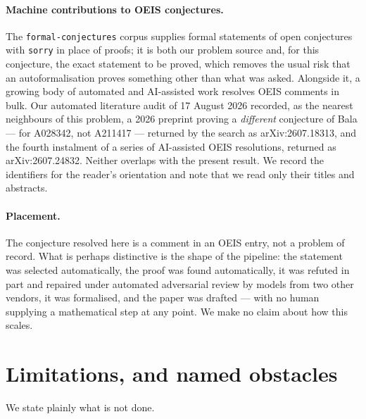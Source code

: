\documentclass[11pt]{article}
\theoremstyle{plain}
\theoremstyle{definition}
\theoremstyle{remark}
\numberwithin{equation}{section}
\begin{document}
\paragraph{Machine contributions to OEIS conjectures.} The \texttt{formal-conjectures} corpus
\cite{formalconjectures} supplies formal statements of open conjectures with \texttt{sorry} in
place of proofs; it is both our problem source and, for this conjecture, the exact statement to
be proved, which removes the usual risk that an autoformalisation proves something other than
what was asked. Alongside it, a growing body of automated and AI-assisted work resolves OEIS
comments in bulk. Our automated literature audit of 17 August 2026 recorded, as the nearest
neighbours of this problem, a 2026 preprint proving a \emph{different} conjecture of Bala --- for
A028342, not A211417 --- returned by the search as arXiv:2607.18313, and the fourth instalment of
a series of AI-assisted OEIS resolutions, returned as arXiv:2607.24832. Neither overlaps with the
present result. We record the identifiers for the reader's orientation and note that we read only
their titles and abstracts.

\paragraph{Placement.} The conjecture resolved here is a comment in an OEIS entry, not a problem
of record. What is perhaps distinctive is the shape of the pipeline: the statement was selected
automatically, the proof was found automatically, it was refuted in part and repaired under
automated adversarial review by models from two other vendors, it was formalised, and the paper
was drafted --- with no human supplying a mathematical step at any point. We make no claim about
how this scales.

\section{Limitations, and named obstacles}
\label{sec:limitations}

We state plainly what is not done.
\end{document}
